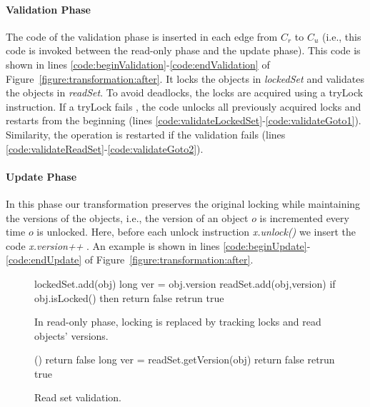 \paragraph{Validation Phase}
The code of the validation phase is inserted in each edge from $C_r$ to $C_u$ (i.e., this code is invoked between the read-only phase and the update phase).
This code is shown in lines \ref{code:beginValidation}-\ref{code:endValidation} of Figure~\ref{figure:transformation:after}.
It locks the objects in \emph{lockedSet} and validates the objects in \emph{readSet}.
To avoid deadlocks, the locks are acquired using a tryLock
instruction.
If a tryLock fails , the code unlocks  all
previously acquired locks and restarts from the beginning
(lines \ref{code:validateLockedSet}-\ref{code:validateGoto1}).
Similarity, the operation is restarted if the validation fails (lines \ref{code:validateReadSet}-\ref{code:validateGoto2}).

\paragraph{Update Phase}
In this phase our transformation preserves the original locking while maintaining the versions of the objects, i.e., the version of an object $o$ is incremented every time $o$ is unlocked.
Here, before each unlock instruction \emph{\ttfamily x.unlock()} we insert the code \emph{\ttfamily x.version++} .
An example is shown in lines \ref{code:beginUpdate}-\ref{code:endUpdate} of Figure~\ref{figure:transformation:after}.


\begin{figure}
\scriptsize
\begin{algorithmic}[1]{}
		{\ttfamily
		\State lockedSet.add(obj) \label{code:lockedSet:add}
			\State long ver = obj.version \label{code:track:getVersion}
			\State readSet.add(obj,version)
			\State if {obj.isLocked()} then return false \label{code:track:returnFalse}
			\State retrun true
		\EndFunction
		}
\end{algorithmic}
\caption{ In read-only phase, locking is replaced by
tracking locks and read
objects' versions.
\label{figure::track}}
\end{figure}




\begin{figure}
\scriptsize
\begin{algorithmic}[1]{}
		{\ttfamily
		()
			\State return false 
			\EndIf
			\State long ver = readSet.getVersion(obj)
				\State return false 
			\EndIf
		\EndFor
		\State retrun true 
		\EndFunction
		}
\end{algorithmic}
\caption{Read set validation.\label{figure::validate}}
\end{figure}


